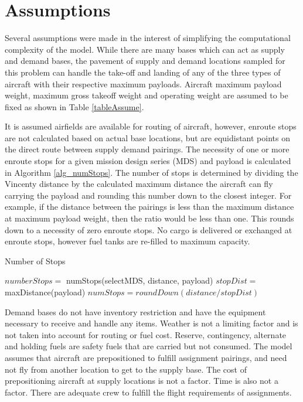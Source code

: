 \section{Assumptions} \label{sec_assumptions}
Several assumptions were made in the interest of simplifying the computational complexity of the model.  While there are many bases which can act as supply and demand bases, the pavement of supply and demand locations sampled for this problem can handle the take-off and landing of any of the three types of aircraft with their respective maximum payloads.  Aircraft
maximum payload weight, maximum gross takeoff weight and operating weight are assumed to
be fixed as shown in Table \ref{tableAssume}.\par
It is assumed airfields are available for routing of aircraft, however, enroute stops are not calculated based on actual base locations, but are equidistant points on the direct route between supply demand pairings.  The necessity of one or more enroute stops for a given mission design series (MDS) and payload is calculated in Algorithm \ref{alg_numStops}. The number of stops is determined by dividing the Vincenty distance \cite{Vincenty1975DirectEquations} by the calculated maximum distance the aircraft can fly carrying the payload and rounding this number down to the closest integer. For example, if the distance between the pairings is less than the maximum distance at maximum payload weight, then the ratio would be less than one. This rounds down to a necessity of zero enroute stops.  No cargo is delivered or exchanged at enroute stops, however fuel tanks are re-filled to maximum capacity.\par
\begin{algorithm}[H]
\caption{Number of Stops}
\label{alg_numStops}
\begin{algorithmic}
		\State $numberStops =$ numStops(selectMDS, distance, payload)
        \State $stopDist =$ maxDistance(payload)
    	\State $numStops = roundDown(distance / stopDist)$
\EndFunction
\end{algorithmic}
\end{algorithm}
Demand bases do not have inventory restriction and have the equipment necessary to receive and handle any items. Weather is not a limiting factor and is not taken into account for routing or fuel cost. Reserve, contingency, alternate and holding fuels are safety fuels that are carried but not consumed.  The model assumes that aircraft are prepositioned to fulfill assignment pairings, and need not fly from another location to get to the supply base. The cost of prepositioning aircraft at supply locations is not a factor. Time is also not a factor.  There are adequate crew to fulfill the flight requirements of assignments. 

